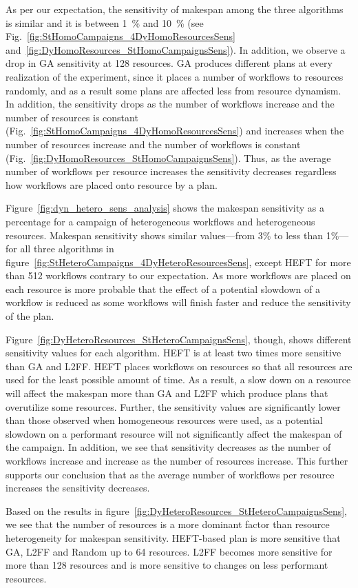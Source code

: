 As per our expectation, the sensitivity of makespan among the three algorithms
is similar and it is between 1~\% and 10~\% (see
Fig.~\ref{fig:StHomoCampaigns_4DyHomoResourcesSens}
and~\ref{fig:DyHomoResources_StHomoCampaignsSens}). In addition, we observe a
drop in GA sensitivity at 128 resources. GA produces different plans at every
realization of the experiment, since it places a number of workflows to
resources randomly, and as a result some plans are affected less from resource
dynamism. In addition, the sensitivity drops as the number of workflows
increase and the number of resources is constant
(Fig.~\ref{fig:StHomoCampaigns_4DyHomoResourcesSens}) and increases when the
number of resources increase and the number of workflows is constant
(Fig.~\ref{fig:DyHomoResources_StHomoCampaignsSens}). Thus, as the average
number of workflows per resource increases the sensitivity decreases
regardless how workflows are placed onto resource by a plan.

Figure~\ref{fig:dyn_hetero_sens_analysis} shows the makespan sensitivity as a
percentage for a campaign of heterogeneous workflows and heterogeneous
resources. Makespan sensitivity shows similar values---from 3\% to less than
1\%---for all three algorithms in
figure~\ref{fig:StHeteroCampaigns_4DyHeteroResourcesSens}, except HEFT for
more than 512 workflows contrary to our expectation. As more workflows are
placed on each resource is more probable that the effect of a potential
slowdown of a workflow is reduced as some workflows will finish faster and
reduce the sensitivity of the plan.

Figure~\ref{fig:DyHeteroResources_StHeteroCampaignsSens}, though, shows
different sensitivity values for each algorithm. HEFT is at least two times
more sensitive than GA and L2FF. HEFT places workflows on resources so that
all resources are used for the least possible amount of time. As a result, a
slow down on a resource will affect the makespan more than GA and L2FF which
produce plans that overutilize some resources. Further, the sensitivity values
are significantly lower than those observed when homogeneous resources were
used, as a potential slowdown on a performant resource will not significantly
affect the makespan of the campaign. In addition, we see that sensitivity
decreases as the number of workflows increase and increase as the number of
resources increase. This further supports our conclusion that as the average
number of workflows per resource increases the sensitivity decreases.

Based on the results in
figure~\ref{fig:DyHeteroResources_StHeteroCampaignsSens}, we see that the
number of resources is a more dominant factor than resource heterogeneity for
makespan sensitivity. HEFT-based plan is more sensitive that GA, L2FF and
Random up to 64 resources. L2FF becomes more sensitive for more than 128
resources and is more sensitive to changes on less performant resources.

